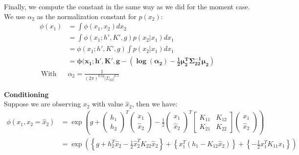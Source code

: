 \documentclass[11pt]{article}
\newcommand{\subsubsubsection}[1]{\noindent\textbf{#1}\\}
\begin{document}
Finally, we compute the constant in the same way as we did for the moment case. We use $\alpha_2$ as the normalization constant for $p(x_2)$:
\begin{align*}
\phi(x_1) &= \int \phi(x_1,x_2)dx_2\\
&= \int \phi(x_1; h', K', g)p(x_2|x_1)dx_1\\
&= \phi(x_1; h', K', g)\int p(x_2|x_1)dx_1\\
&= \bm{\phi(x_1; h', K', g-(\log(\alpha_2)-\frac{1}{2}\mu_2^T \Sigma_{22}^{-1}\mu_2)}\\
~\text{With~}&\alpha_2=\frac{1}{(2\pi)^{0.5q}|\Sigma_{22}|^{0.5}}
\end{align*}

\subsubsubsection{Conditioning}
Suppose we are observing $x_2$ with value $\hat{x}_2$, then we have:
\begin{align*}
\phi(x_1, x_2=\hat{x}_2) &= \exp\left( g + \left( \begin{array}{c} h_1 \\ h_2 \end{array}\right)^T
                                           \left( \begin{array}{c} x_1 \\ \hat{x}_2 \end{array}\right)
- \frac{1}{2} \left( \begin{array}{c} x_1 \\ \hat{x}_2 \end{array}\right)^T
              \left[ \begin{array}{cc} K_{11} & K_{12} \\ K_{21} & K_{22} \end{array} \right]
              \left( \begin{array}{c} x_1 \\ \hat{x}_2 \end{array}\right)
                                        \right)\\
&= \exp \left(
              \left\{ g + h_2^T\hat{x}_2 - \frac{1}{2}\hat{x}_2^T K_{22} \hat{x}_2 \right\} +
              \left\{ x_1^T(h_1-K_{12}\hat{x}_2) \right\} +
              \left\{ -\frac{1}{2}x_1^T K_{11}x_1 \right\}
        \right)
\end{align*}
\end{document}
